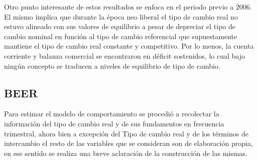 \documentclass[12pt,letterpaper]{article}
\begin{document}
Otro punto interesante de estos resultados se enfoca en el periodo previo a 2006. El mismo implica que durante la época neo liberal el tipo de cambio real no estuvo alineado con sus valores de equilibrio a pesar de depreciar el tipo de cambio nominal en función al tipo de cambio referencial que supuestamente  mantiene el tipo de cambio real constante y competitivo. Por lo menos, la cuenta corriente y balanza comercial se encontraron en déficit sostenidos, lo cual bajo ningún concepto se traducen a niveles de equilibrio de tipo de cambio.







\subsection*{BEER}
Para estimar el modelo de comportamiento se procedió a recolectar la información del tipo de cambio real y de sus fundamentos en frecuencia trimestral, ahora bien a excepción del Tipo de cambio real y de los términos de intercambio el resto de las variables que se consideran son de elaboración propia, en ese sentido se realiza una breve aclaración de la construcción de las mismas. 
\end{document}
